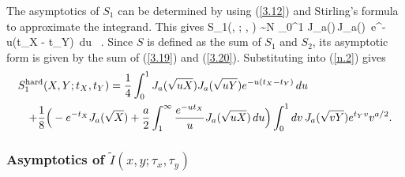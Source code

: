The 
asymptotics of $S_{1}$ can be determined by using (\ref{3.12}) and Stirling's 
formula to approximate the integrand. This gives 
\beqa
S_{1}\left(, ; ,  
\right) 
\sim  N \int_{0}^{1} J_{a}\left(\right)\,J_{a}\left(\right)\, 
e^{-u(t_{X} - t_{Y})}\, du \,  . 
\label{3.20}
\eeqa
Since $S$ is defined as the sum of $S_{1}$ and $S_{2}$, its asymptotic form 
is given 
by the sum of (\ref{3.19}) and (\ref{3.20}). Substituting into (\ref{n.2})
gives
\begin{eqnarray}\label{3.20'} \lefteqn{
S_1^{\rm hard}(X,Y;t_X,t_Y) = {1 \over 4} \int_0^1 J_a(\sqrt{uX})
J_a(\sqrt{uY}) e^{-u(t_X - t_Y)} \, du} \nonumber \\ &&
+ {1 \over 8} \Big ( - e^{-t_X} J_a(\sqrt{X}) + {a \over 2}
\int_1^\infty {e^{-u t_X} \over u} J_a(\sqrt{uX}) \, du \Big )
\int_0^1 dv \, J_a(\sqrt{vY}) e^{t_Y v} v^{a/2}.
\end{eqnarray}

\subsubsection*{Asymptotics of $\tilde{I} (x, y; \tau_{x}, \tau_{y})$} 

